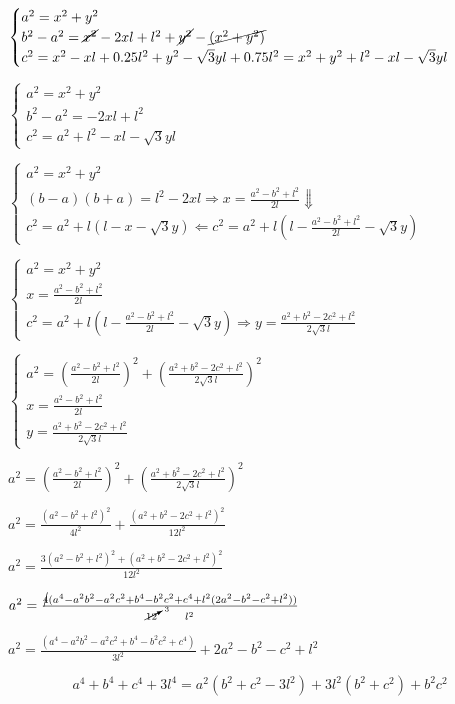 \documentclass[10pt,a4paper]{article}
\begin{document}
$\begin{cases}
a^2 = x^2 + y^2\\
b^2-a^2=\cancel{x^2}-2xl+l^2 + \cancel{y^2}-\cancel{(x^2+y^2)}\\
c^2 = x^2-xl+0.25l^2 + y^2-\sqrt{3}yl+0.75l^2 = x^2+y^2+l^2-xl-\sqrt{3}yl
\end{cases}$

$\begin{cases}
a^2 = x^2 + y^2\\
b^2-a^2=-2xl+l^2\\
c^2 =  a^2+l^2-xl-\sqrt{3}yl
\end{cases}$

$\begin{cases}
a^2 = x^2 + y^2\\
(b-a)(b+a)=l^2-2xl \Rightarrow x = \frac{a^2 - b^2 + l^2}{2 l} \Downarrow \\
c^2 = a^2+l(l-x-\sqrt{3}y) \Leftarrow c^2 = a^2+l(l-\frac{a^2 - b^2 + l^2}{2 l}-\sqrt{3}y)
\end{cases}$

$\begin{cases}
a^2 = x^2 + y^2\\
x = \frac{a^2 - b^2 + l^2}{2 l}  \\
c^2 = a^2+l(l-\frac{a^2 - b^2 + l^2}{2 l}-\sqrt{3}y) \Rightarrow y = \frac{a^2 + b^2 - 2 c^2 + l^2}{2 \sqrt{3} l}
\end{cases}$

$\begin{cases}
a^2 = (\frac{a^2 - b^2 + l^2}{2 l})^2 + (\frac{a^2 + b^2 - 2 c^2 + l^2}{2 \sqrt{3} l})^2\\
x = \frac{a^2 - b^2 + l^2}{2 l}  \\
y = \frac{a^2 + b^2 - 2 c^2 + l^2}{2 \sqrt{3} l}
\end{cases}$

$a^2 = (\frac{a^2 - b^2 + l^2}{2 l})^2 + (\frac{a^2 + b^2 - 2 c^2 + l^2}{2 \sqrt{3} l})^2$

$a^2 = \frac{(a^2 - b^2 + l^2)^2}{4 l^2} + \frac{(a^2 + b^2 - 2 c^2 + l^2)^2}{12 l^2}$

$a^2 = \frac{3 (a^2 - b^2 + l^2)^2 + (a^2 + b^2 - 2 c^2 + l^2)^2}{12 l^2}$

$a^2 = \frac{\cancel{4} (a^4 - a^2 b^2 - a^2 c^2  + b^4 - b^2 c^2 + c^4 + l^2(2 a^2 - b^2 - c^2 + l^2) )}{\cancelto{3}{12}\qquad l^2}$

$a^2 = \frac{(a^4 - a^2 b^2 - a^2 c^2  + b^4 - b^2 c^2 + c^4)}{3 l^2} + 2 a^2 - b^2 - c^2 + l^2$

\begin{large}
	$$a^4 + b^4 + c^4 + 3 l^4 = a^2 (b^2 + c^2 - 3 l^2) + 3 l^2 (b^2 + c^2) + b^2 c^2$$
\end{large}
\end{document}
